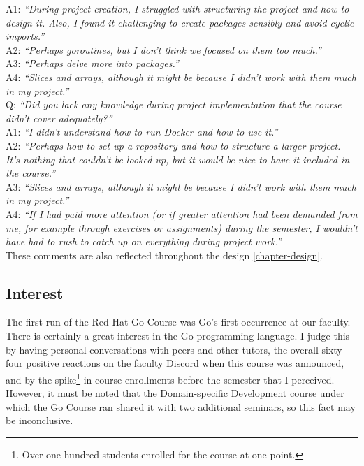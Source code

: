 \documentclass[
  digital,
  color,
  oneside,
  nosansbold,
  nocolorbold,
  nolof,
  nolot,
]{fithesis4}
\begin{document}
\noindent
A1: \textit{\enquote{During project creation, I struggled with structuring the project and how to design it. Also, I found it challenging to create packages sensibly and avoid cyclic imports.}} \\

\noindent
A2: \textit{\enquote{Perhaps goroutines, but I don't think we focused on them too much.}} \\

\noindent
A3: \textit{\enquote{Perhaps delve more into packages.}} \\

\noindent
A4: \textit{\enquote{Slices and arrays, although it might be because I didn't work with them much in my project.}} \\

\noindent
Q: \textit{\enquote{Did you lack any knowledge during project implementation that the course didn't cover adequately?}} \\

\noindent
A1: \textit{\enquote{I didn't understand how to run Docker and how to use it.}} \\

\noindent
A2: \textit{\enquote{Perhaps how to set up a repository and how to structure a larger project. It's nothing that couldn't be looked up, but it would be nice to have it included in the course.}} \\

\noindent
A3: \textit{\enquote{Slices and arrays, although it might be because I didn't work with them much in my project.}} \\

\noindent
A4: \textit{\enquote{If I had paid more attention (or if greater attention had been demanded from me, for example through exercises or assignments) during the semester, I wouldn't have had to rush to catch up on everything during project work.}} \\

\noindent
These comments are also reflected throughout the design \cref{chapter-design}.

\subsection{Interest}

The first run of the Red Hat Go Course was Go's first occurrence at our faculty. There is certainly a great interest in the Go programming language. I judge this by having personal conversations with peers and other tutors, the overall sixty-four positive reactions on the faculty Discord when this course was announced, and by the spike\footnote{Over one hundred students enrolled for the course at one point.}
in course enrollments before the semester that I perceived. However, it must be noted that the Domain-specific Development course under which the Go Course ran shared it with two additional seminars, so this fact may be inconclusive.
\end{document}
